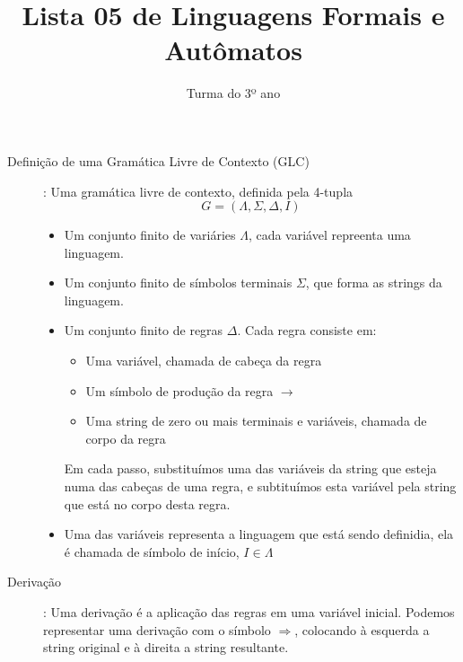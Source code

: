 \documentclass[12pt]{article}
\title{Lista 05 de Linguagens Formais e Autômatos}
\date{}
\author{Turma do 3º ano}
\begin{document}
 

\maketitle

\begin{description}

\item[Definição de uma Gramática Livre de Contexto (GLC)]: Uma gramática livre de contexto, definida pela 4-tupla
\[G = (\Lambda, \Sigma, \Delta, I)\]
\begin{itemize}
\item Um conjunto finito de variáries $\Lambda$, cada variável repreenta uma linguagem.
\item Um conjunto finito de símbolos terminais $\Sigma$, que forma as strings da linguagem.
\item Um conjunto finito de regras $\Delta$. Cada regra consiste em:
  \begin{itemize}
  \item Uma variável, chamada de cabeça da regra
  \item Um símbolo de produção da regra $\rightarrow$
  \item Uma string de zero ou mais terminais e variáveis, chamada de corpo da regra
  \end{itemize}
  Em cada passo, substituímos uma das variáveis da string que esteja numa das cabeças de uma regra, e subtituímos esta variável pela string que está no corpo desta regra.
\item Uma das variáveis representa a linguagem que está sendo definidia, ela é chamada de símbolo de início, $I\in \Lambda$
\end{itemize}

\item[Derivação]: Uma derivação é a aplicação das regras em uma variável inicial. Podemos representar uma derivação com o símbolo $\Rightarrow$, colocando à esquerda a string original e à direita a string resultante.

\end{description}

\vspace{3em}
\end{document}
